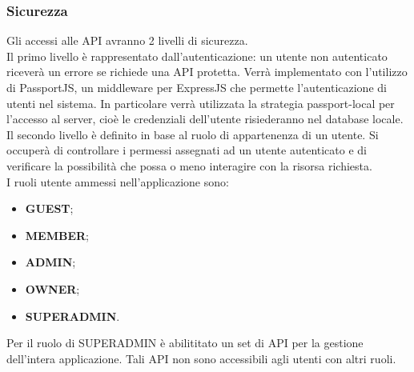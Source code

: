 \subsubsection{Sicurezza}
Gli accessi alle API avranno 2 livelli di sicurezza. \\
Il primo livello è rappresentato dall'autenticazione: un utente non autenticato riceverà un errore se richiede una API protetta. Verrà implementato con l'utilizzo di PassportJS, un middleware per ExpressJS che permette l'autenticazione di utenti nel sistema. In particolare verrà utilizzata la strategia passport-local per l'accesso al server, cioè le credenziali dell'utente risiederanno nel database locale. \\
Il secondo livello è definito in base al ruolo di appartenenza di un utente. Si occuperà di controllare i permessi assegnati ad un utente autenticato e di verificare la possibilità che possa o meno interagire con la risorsa richiesta. \\
I ruoli utente ammessi nell'applicazione sono: 
\begin{itemize}
\item \textbf{GUEST};
\item \textbf{MEMBER};
\item \textbf{ADMIN};
\item \textbf{OWNER};
\item \textbf{SUPERADMIN}.
\end{itemize}
Per il ruolo di SUPERADMIN è abilititato un set di API per la gestione dell'intera applicazione. Tali API non sono accessibili agli utenti con altri ruoli.
